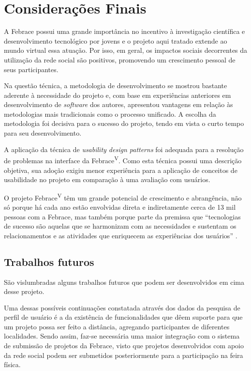 
\chapter{Considerações Finais}

A Febrace possui uma grande importância no incentivo à investigação científica e desenvolvimento tecnológico por jovens e o projeto aqui tratado extende ao mundo virtual essa atuação. Por isso, em geral, os impactos sociais decorrentes da utilização da rede social são positivos, promovendo um crescimento pessoal de seus participantes.

Na questão técnica, a metodologia de desenvolvimento se mostrou bastante aderente à necessidade do projeto e, com base em experiências anteriores em desenvolvimento de \textit{software} dos autores, apresentou vantagens em relação às metodologias mais tradicionais como o processo unificado. A escolha da metodologia foi decisiva para o sucesso do projeto, tendo em vista o curto tempo para seu desenvolvimento.

A aplicação da técnica de \textit{usability design patterns} foi adequada para a resolução de problemas na interface da Febrace\textsuperscript{V}. Como esta técnica possui uma descrição objetiva, sua adoção exigiu menor experiência para a aplicação de conceitos de usabilidade no projeto em comparação à uma avaliação com usuários.

O projeto Febrace\textsuperscript{V} têm um grande potencial de crescimento e abrangência, não só porque há cada ano estão envolvidas direta e indiretamente cerca de 13 mil pessoas com a Febrace, mas também porque parte da premissa que “tecnologias de sucesso são aquelas que se harmonizam com as necessidades e sustentam os relacionamentos e as atividades que enriquecem as experiências dos usuários” \cite{shneiderman06}.

\section{Trabalhos futuros}

São vislumbradas alguns trabalhos futuros que podem ser desenvolvidos em cima desse projeto. 

Uma dessas possíveis continuações constatada através dos dados da pesquisa de perfil de usuário é a da existência de funcionalidades que dêem suporte para que um projeto possa ser feito a distância, agregando participantes de diferentes localidades. Sendo assim, faz-se necessária uma maior integração com o sistema de submissão de projetos da Febrace, visto que projetos desenvolvidos com apoio da rede social podem ser submetidos posteriormente para a participação na feira física. 

